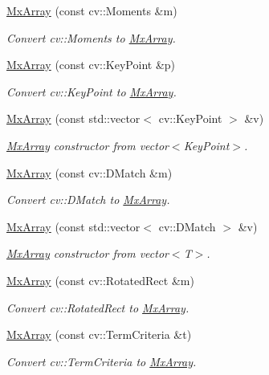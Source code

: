\begin{DoxyCompactItemize}
\hyperlink{class_mx_array_a53bb6d88f1eb9639299ded9f0e371a64}{\-Mx\-Array} (const cv\-::\-Moments \&m)
\begin{DoxyCompactList}\small\item\em \-Convert cv\-::\-Moments to \hyperlink{class_mx_array}{\-Mx\-Array}. \end{DoxyCompactList}\item 
\hyperlink{class_mx_array_aa0d408bf4f1bfaec86b916cfd9f94d41}{\-Mx\-Array} (const cv\-::\-Key\-Point \&p)
\begin{DoxyCompactList}\small\item\em \-Convert cv\-::\-Key\-Point to \hyperlink{class_mx_array}{\-Mx\-Array}. \end{DoxyCompactList}\item 
\hyperlink{class_mx_array_a91cfe53794d6b259c5361e0ed92918db}{\-Mx\-Array} (const std\-::vector$<$ cv\-::\-Key\-Point $>$ \&v)
\begin{DoxyCompactList}\small\item\em \hyperlink{class_mx_array}{\-Mx\-Array} constructor from vector$<$\-Key\-Point$>$. \end{DoxyCompactList}\item 
\hyperlink{class_mx_array_a86c84d476db4160af1f95c575d0dc79a}{\-Mx\-Array} (const cv\-::\-D\-Match \&m)
\begin{DoxyCompactList}\small\item\em \-Convert cv\-::\-D\-Match to \hyperlink{class_mx_array}{\-Mx\-Array}. \end{DoxyCompactList}\item 
\hyperlink{class_mx_array_a7af56911425a206c9f1055b09aa48e3e}{\-Mx\-Array} (const std\-::vector$<$ cv\-::\-D\-Match $>$ \&v)
\begin{DoxyCompactList}\small\item\em \hyperlink{class_mx_array}{\-Mx\-Array} constructor from vector$<$\-T$>$. \end{DoxyCompactList}\item 
\hyperlink{class_mx_array_a1d2ee90b6e776e5e866e0ddf8295c9b7}{\-Mx\-Array} (const cv\-::\-Rotated\-Rect \&m)
\begin{DoxyCompactList}\small\item\em \-Convert cv\-::\-Rotated\-Rect to \hyperlink{class_mx_array}{\-Mx\-Array}. \end{DoxyCompactList}\item 
\hyperlink{class_mx_array_aada2490f2a1f10ac71ba8b1cba5ea4cf}{\-Mx\-Array} (const cv\-::\-Term\-Criteria \&t)
\begin{DoxyCompactList}\small\item\em \-Convert cv\-::\-Term\-Criteria to \hyperlink{class_mx_array}{\-Mx\-Array}. \end{DoxyCompactList}\item 

\end{DoxyCompactItemize}
